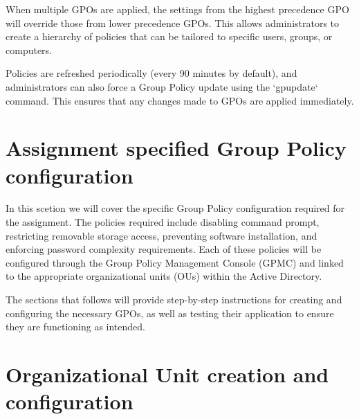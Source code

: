 When multiple GPOs are applied, the settings from the highest precedence GPO will override those from lower precedence GPOs. This allows administrators to create a hierarchy of policies that can be tailored to specific users, groups, or computers.

Policies are refreshed periodically (every 90 minutes by default), and administrators can also force a Group Policy update using the `gpupdate` command. This ensures that any changes made to GPOs are applied immediately.

\section{Assignment specified Group Policy configuration}

In this scetion we will cover the specific Group Policy configuration required for the assignment. The policies required include disabling command prompt, restricting removable storage access, preventing software installation, and enforcing password complexity requirements. Each of these policies will be configured through the Group Policy Management Console (GPMC) and linked to the appropriate organizational units (OUs) within the Active Directory.

The sections that follows will provide step-by-step instructions for creating and configuring the necessary GPOs, as well as testing their application to ensure they are functioning as intended.

\section{Organizational Unit creation and configuration}

